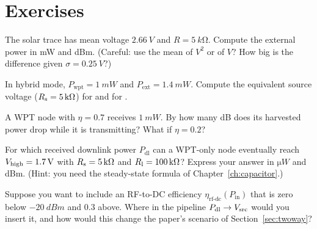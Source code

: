 \section*{Exercises}
\begin{exercise}
The solar trace has mean voltage $\SI{2.66}{V}$ and $R=\SI{5}{k\ohm}$. Compute the external power in mW and dBm. (Careful: use the mean of $V^2$ or of $V$? How big is the difference given $\sigma=\SI{0.25}{V}$?)
\end{exercise}
\begin{exercise}
In hybrid mode, $P_{\mathrm{wpt}}=\SI{1}{mW}$ and $P_{\mathrm{ext}}=\SI{1.4}{mW}$. Compute the equivalent source voltage ($R_{\mathrm{s}}=\SI{5}{k\ohm}$) for  and for .
\end{exercise}
\begin{exercise}
A WPT node with $\eta=0.7$ receives $\SI{1}{mW}$. By how many dB does its harvested power drop while it is transmitting? What if $\eta=0.2$?
\end{exercise}
\begin{exercise}
For which received downlink power $P_{\mathrm{dl}}$ can a WPT-only node eventually reach $V_{\mathrm{high}}=\SI{1.7}{V}$ with $R_{\mathrm{s}}=\SI{5}{k\ohm}$ and $R_{\mathrm{l}}=\SI{100}{k\ohm}$? Express your answer in $\si{\micro W}$ and dBm. (Hint: you need the steady-state formula of Chapter~\ref{ch:capacitor}.)
\end{exercise}
\begin{exercise}\label{ex:rectifier}
Suppose you want to include an RF-to-DC efficiency $\eta_{\mathrm{rf\text{-}dc}}(P_{\mathrm{in}})$ that is zero below $\SI{-20}{dBm}$ and $0.3$ above. Where in the pipeline $P_{\mathrm{dl}}\to V_{\mathrm{src}}$ would you insert it, and how would this change the paper's scenario of Section~\ref{sec:twoway}?
\end{exercise}
